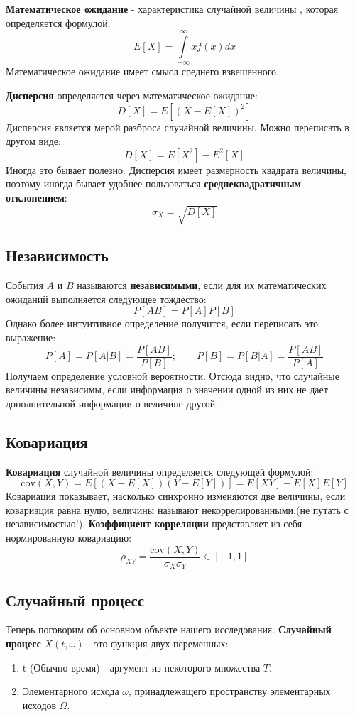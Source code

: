 \documentclass[a4paper, 12pt]{article}
\begin{document}
\textbf{Математическое ожидание} - характеристика случайной величины , которая определяется формулой:
$$
E[X] = \int\limits_{-\infty}^{\infty}x f(x)dx
$$
Математическое ожидание имеет смысл среднего взвешенного.

\textbf{Дисперсия} определяется через математическое ожидание:
$$
D[X] = E[(X - E[X])^2]
$$
Дисперсия является мерой разброса случайной величины. Можно переписать в другом виде:
$$
D[X] = E[X^2] -E^2[X] 
$$
Иногда это бывает полезно.
Дисперсия имеет размерность квадрата величины, поэтому иногда бывает удобнее пользоваться \textbf{среднеквадратичным отклонением}:
$$
\sigma_X = \sqrt{D[X]}
$$

\subsection{Независимость}
События $A$ и $B$ называются \textbf{независимыми}, если для их математических ожиданий выполняется следующее тождество:
$$
P[AB] = P[A]P[B]
$$
Однако более интуитивное определение получится, если переписать это выражение:
$$
P[A] = P[A|B] = \frac{P[AB]}{P[B]}; \qquad P[B]= P[B|A] = \frac{P[AB]}{P[A]}
$$
Получаем определение условной вероятности. Отсюда видно, что случайные величины независимы, если информация о значении одной из них не дает дополнительной информации о величине другой. 

\subsection{Ковариация}
\textbf{Ковариация} случайной величины определяется следующей формулой:
$$
\text{cov}(X, Y) = E[(X - E[X])(Y - E[Y])] = E[XY] - E[X]E[Y]
$$
Ковариация показывает, насколько синхронно изменяются две величины, если ковариация равна нулю, величины называют некоррелированными.(не путать с независимостью!). \textbf{Коэффициент корреляции} представляет из себя нормированную ковариацию:
$$
\rho_{XY} = \frac{\text{cov}(X,Y)}{\sigma_X\sigma_Y} \in [-1, 1]
$$

\subsection{Случайный процесс}
Теперь поговорим об основном объекте нашего исследования.
\textbf{Случайный процесс} $X(t, \omega)$ - это функция двух переменных:
\begin{enumerate}
    \item t (Обычно время) - аргумент из некоторого множества $T$.
    \item Элементарного исхода $\omega$, принадлежащего пространству элементарных исходов $\Omega$. 
\end{enumerate}
\end{document}
